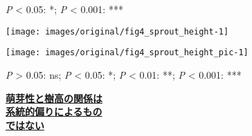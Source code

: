 \documentclass[a0, 30pt, plainboxedsections]{sciposter} %
\begin{document}
\begin{multicols}{2}
\begin{mdframed}[style=subsection.frame,frametitle=\textbf{\huge{\ding{194}}\LARGE{萌芽性が強い種ほど自己被陰率が下がる}}]
\begin{figure}
\begin{minipage}{0.75\hsize}
   \flushleft\vspace{-1em}\hspace*{0.6em}
    {\tiny \textit{P} < 0.05: *; \textit{P} < 0.001: ***}
 \end{minipage}
\end{figure}

\end{mdframed}

\columnbreak
\begin{mdframed}[style=subsection.frame,frametitle=\textbf{\huge{\ding{193}}\LARGE{萌芽性が強くなるほど樹高が低くなる}}]

\vspace{-1.0em}
\begin{figure}
	\centering
		\texttt{[image: images/original/fig4\_sprout\_height-1]}
	
	\flushleft
\end{figure}

\vspace{-1.5em}
\begin{figure}
 \begin{minipage}{0.55\hsize}
  \centering
   \texttt{[image: images/original/fig4\_sprout\_height\_pic-1]}
   
   {\tiny \textit{P} > 0.05: ns; \textit{P} < 0.05: *; \textit{P} < 0.01: **; \textit{P} < 0.001: ***}
 \end{minipage}
 \begin{minipage}{0.45\hsize}
{\large \faHandLeft \textbf{\underline{萌芽性と樹高の関係は}}\\ \textbf{\underline{系統的偏りによるもの}}\\\textbf{\underline{ではない}}}
 \end{minipage}
\end{figure}

\end{mdframed}

\end{multicols}

\end{document}
